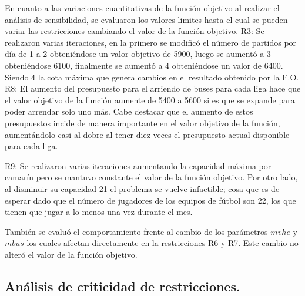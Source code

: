 \indent En cuanto a las variaciones cuantitativas de la función objetivo al realizar el análisis de sensibilidad, se evaluaron los valores limites hasta el cual se pueden variar las restricciones cambiando el valor de la función objetivo.
\indent R3: Se realizaron varias iteraciones, en la primero se modificó el número de partidos por día de 1 a 2 obteniéndose un valor objetivo de 5900, luego se aumentó a 3 obteniéndose 6100, finalmente se aumentó a 4 obteniéndose un valor de 6400. Siendo 4 la cota máxima que genera cambios en el resultado obtenido por la F.O.
\indent R8: El aumento del presupuesto para el arriendo de buses para cada liga hace que el valor objetivo de la función aumente de 5400 a 5600 si es que se expande para poder arrendar solo uno más. Cabe destacar que el aumento de estos presupuestos incide de manera importante en el valor objetivo de la función, aumentándolo casi al dobre al tener diez veces el presupuesto actual disponible para cada liga. 

\indent R9: Se realizaron varias iteraciones aumentando la capacidad máxima por camarín pero se mantuvo constante el valor de la función objetivo. Por otro lado, al disminuir su capacidad 21 el problema se vuelve infactible; cosa que es de esperar dado que el número de jugadores de los equipos de fútbol son 22, los que tienen que jugar a lo menos una vez durante el mes.

\indent También se evaluó el comportamiento frente al cambio de los parámetros $mvhe$ y $mbus$ los cuales afectan directamente en la restricciones R6 y R7. Este cambio no alteró el valor de la función objetivo.

\subsection{Análisis de criticidad de restricciones. }

